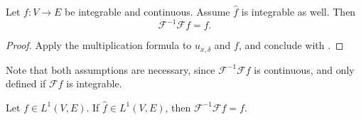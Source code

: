 \begin{theorem}
  \label{thm:fourier-inversion}
  Let $f:V\to E$ be integrable and continuous. Assume $\widehat f$ is integrable as well. Then
  $$\mathcal F^{-1}\mathcal F f=f.$$
  \leanok
\end{theorem}
\begin{proof}
\leanok
Apply the multiplication formula  to $u_{x,\delta}$ and $f$, and conclude with
.
\end{proof}

\begin{remark}
  Note that both assumptions are necessary, since $\mathcal F^{-1}\mathcal Ff$ is continuous, and
  only defined if $\mathcal Ff$ is integrable.
\end{remark}

\begin{theorem}
  \label{thm:fourier-inversion-L1}
  \leanok
  Let $f\in L^1(V,E)$. If $\widehat f\in L^1(V,E)$, then $\mathcal F^{-1}\mathcal Ff=f$.
\end{theorem}

